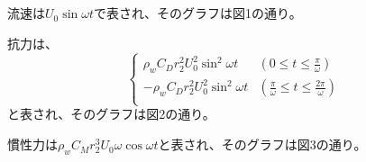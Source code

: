 \documentclass[a4paper]{jsarticle}
\begin{document}
\subsection{}
流速は$U_0 \sin \omega t$で表され、そのグラフは図1の通り。\par
抗力は、
\begin{equation}
  \begin{cases}
    \rho_w C_D r_2^2 U_0^2 \sin^2 \omega t & \left(0 \leq t \leq \frac{\pi}{\omega}\right) \\
    -\rho_w C_D r_2^2 U_0^2 \sin^2 \omega t & \left(\frac{\pi}{\omega} \leq t \leq \frac{2\pi}{\omega}\right) \\
  \end{cases}
\end{equation}
と表され、そのグラフは図2の通り。\par
慣性力は$\rho_w C_M r_2^3 U_0 \omega \cos \omega t$と表され、そのグラフは図3の通り。
\end{document}
